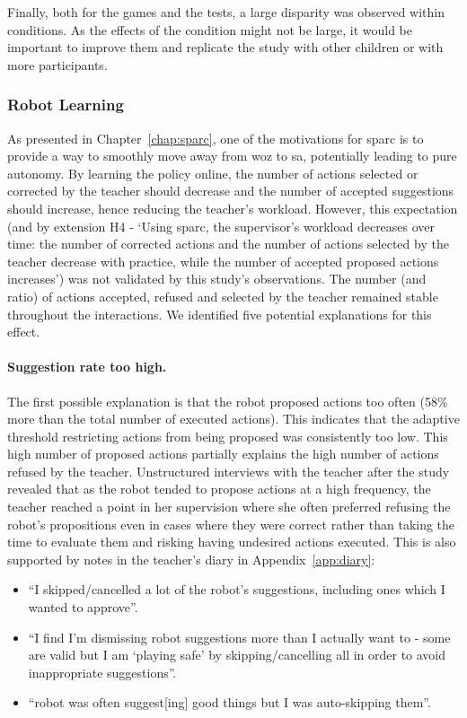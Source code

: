 Finally, both for the games and the tests, a large disparity was observed within conditions. As the effects of the condition might not be large, it would be important to improve them and replicate the study with other children or with more participants.

\subsubsection{Robot Learning} \label{sec:tutoring_disc_learning}

As presented in Chapter~\ref{chap:sparc}, one of the motivations for \gls{sparc} is to provide a way to smoothly move away from \gls{woz} to \gls{sa}, potentially leading to pure autonomy. By learning the policy online, the number of actions selected or corrected by the teacher should decrease and the number of accepted suggestions should increase, hence reducing the teacher's workload. However, this expectation (and by extension H4 - `Using \gls{sparc}, the supervisor's workload decreases over time: the number of corrected actions and the number of actions selected  by the teacher decrease with practice, while the number of accepted proposed actions increases') was not validated by this study's observations. The number (and ratio) of actions accepted, refused and selected by the teacher remained stable throughout the interactions. We identified five potential explanations for this effect.

\paragraph{Suggestion rate too high.} \label{sec:tuto_rate}
The first possible explanation is that the robot proposed actions too often (58\% more than the total number of executed actions). This indicates that the adaptive threshold restricting actions from being proposed was consistently too low. This high number of proposed actions partially explains the high number of actions refused by the teacher. Unstructured interviews with the teacher after the study revealed that as the robot tended to propose actions at a high frequency, the teacher reached a point in her supervision where she often preferred refusing the robot's propositions even in cases where they were correct rather than taking the time to evaluate them and risking having undesired actions executed. This is also supported by notes in the teacher's diary in Appendix~\ref{app:diary}:
\begin{itemize}
	\item ``I skipped/cancelled a lot of the robot’s suggestions, including ones which I wanted to approve''.
	\item ``I find I’m dismissing robot suggestions more than I actually want to - some are valid but I am `playing safe' by skipping/cancelling all in order to avoid inappropriate suggestions''.
	\item ``robot was often suggest[ing] good things but I was auto-skipping them''.
\end{itemize}

